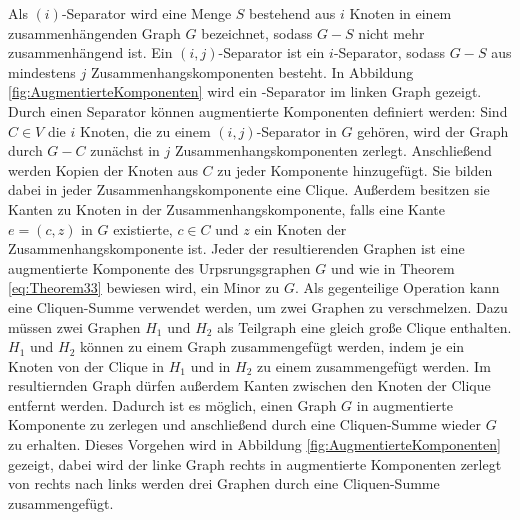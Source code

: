 Als $(i)$-Separator wird eine Menge $S$ bestehend aus $i$ Knoten in einem zusammenhängenden Graph $G$ bezeichnet, sodass $G - S$ nicht mehr zusammenhängend ist.
Ein $(i, j)$-Separator ist ein $i$-Separator, sodass $G-S$ aus mindestens $j$ Zusammenhangskomponenten besteht.
In Abbildung \ref{fig:AugmentierteKomponenten} wird ein \dd-Separator im linken Graph gezeigt.
Durch einen Separator können augmentierte Komponenten definiert werden:
Sind $C \in V$ die $i$ Knoten, die zu einem $(i, j)$-Separator in $G$ gehören, wird der Graph durch $G - C$ zunächst in $j$ Zusammenhangskomponenten zerlegt.
Anschließend werden Kopien der Knoten aus $C$ zu jeder Komponente hinzugefügt.
Sie bilden dabei in jeder Zusammenhangskomponente eine Clique.
Außerdem besitzen sie Kanten zu Knoten in der Zusammenhangskomponente, falls eine Kante $e = (c, z)$ in $G$ existierte, $c \in C$ und $z$ ein Knoten der Zusammenhangskomponente ist.
Jeder der resultierenden Graphen ist eine augmentierte Komponente des Urpsrungsgraphen $G$ und wie in Theorem \ref{eq:Theorem33} bewiesen wird, \evtl ein Minor zu $G$.
Als gegenteilige Operation kann eine Cliquen-Summe verwendet werden, um zwei Graphen zu verschmelzen.
Dazu müssen zwei Graphen $H_1$ und $H_2$ als Teilgraph eine gleich große Clique enthalten.
$H_1$ und $H_2$ können zu einem Graph zusammengefügt werden, indem je ein Knoten von der Clique in $H_1$ und in $H_2$ zu einem zusammengefügt werden.
Im resultiernden Graph dürfen außerdem Kanten zwischen den Knoten der Clique entfernt werden.
Dadurch ist es möglich, einen Graph $G$ in augmentierte Komponente zu zerlegen und anschließend durch eine Cliquen-Summe wieder $G$ zu erhalten.
Dieses Vorgehen wird in Abbildung \ref{fig:AugmentierteKomponenten} gezeigt, dabei wird der linke Graph rechts in augmentierte Komponenten zerlegt \bzw von rechts nach links werden drei Graphen durch eine Cliquen-Summe zusammengefügt.

